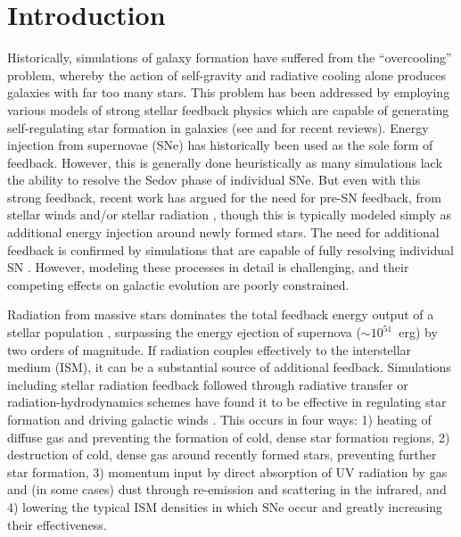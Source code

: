 \documentclass[twocolumn]{aastex62}
\begin{document}

\section{Introduction} \label{sec:intro}
Historically, simulations of galaxy formation have suffered from the ``overcooling'' problem, whereby the action of self-gravity and radiative cooling alone produces galaxies with far too many stars. This problem has been addressed by employing various models of strong stellar feedback physics which are capable of generating self-regulating star formation in galaxies (see \cite{SomervilleDave2015} and \cite{NaabOstriker2017} for recent reviews). Energy injection from supernovae (SNe) has historically been used as the sole form of feedback. However, this is generally done heuristically as many simulations lack the ability to resolve the Sedov phase of individual SNe. But even with this strong feedback, recent work has argued for the need for pre-SN feedback, from stellar winds and/or stellar radiation \citep[e.g.][]{Hu2016,Hopkins2018}, though this is typically modeled simply as additional energy injection around newly formed stars. The need for additional feedback is confirmed by simulations that are capable of fully resolving individual SN \citep[e.g.][]{Peters2017,Smith2018a,Smith2018b,Hu2018}. However, modeling these processes in detail is challenging, and their competing effects on galactic evolution are poorly constrained.

Radiation from massive stars dominates the total feedback energy output of a stellar population \citep[e.g.][]{Abbott1982,Leitherer1999,Agertz2013}, surpassing the energy ejection of supernova ($\sim 10^{51}$~erg) by two orders of magnitude. If radiation couples effectively to the interstellar medium (ISM), it can be a substantial source of additional feedback. Simulations including stellar radiation feedback followed through radiative transfer or radiation-hydrodynamics schemes have found it to be effective in regulating star formation and driving galactic winds \citep[e.g.][]{WiseAbel2012,Kim2013a,Sales2014,Oshea2015,Rosdahl2015,Pawlik2015,Ocvirk2016,Peters2017}. This occurs in four ways: 1) heating of diffuse gas and preventing the formation of cold, dense star formation regions, 2) destruction of cold, dense gas around recently formed stars, preventing further star formation, 3) momentum input by direct absorption of UV radiation by gas and (in some cases) dust through re-emission and scattering in the infrared, and 4) lowering the typical ISM densities in which SNe occur and greatly increasing their effectiveness. 
\end{document}
